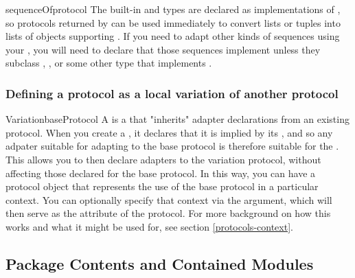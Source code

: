 \begin{verbatim%
}
\begin{verbatim%
}
\begin{verbatim%
}
\begin{verbatim%
}
\begin{verbatim%
}
\begin{verbatim%
}
\begin{funcdesc}{sequenceOf}{protocol}
The built-in  and  types are declared as
implementations of , so protocols returned by
 can be used immediately to convert lists or tuples into
lists of objects supporting .  If you need to adapt other kinds
of sequences using your , you will need to declare
that those sequences implement  unless they
subclass , , or some other type that implements
.
\end{funcdesc}

\subsubsection{Defining a protocol as a local variation of another protocol}\label{protocols-generated-local}

\begin{classdesc}{Variation}{baseProtocol }
A  is a  that "inherits" adapter declarations
from an existing protocol.  When you create a , it declares
that it is implied by its , and so any adpater suitable for
adapting to the base protocol is therefore suitable for the .
This allows you to then declare adapters to the variation protocol, without
affecting those declared for the base protocol.  In this way, you can have a
protocol object that represents the use of the base protocol in a particular
context.  You can optionally specify that context via the 
argument, which will then serve as the  attribute of the
protocol.  For more background on how this works and what it might be used for,
see section \ref{protocols-context}.
\end{classdesc}
























\newpage
\subsection{Package Contents and Contained Modules\label{protocols-contents}}


\end{verbatim%
}
\end{verbatim%
}
\end{verbatim%
}
\end{verbatim%
}
\end{verbatim%
}
\end{verbatim%
}
